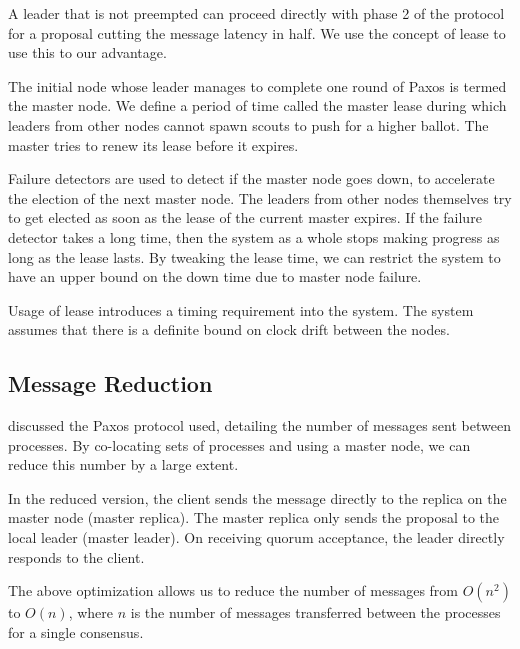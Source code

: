 A leader that is not preempted can proceed directly with phase 2 of the
protocol for a proposal cutting the message latency in half. We use the
concept of lease to use this to our advantage.

The initial node whose leader manages to complete one round of Paxos is
termed the master node. We define a period of time called the master lease
during which leaders from other nodes cannot spawn scouts to push for a
higher ballot. The master tries to renew its lease before it expires.

Failure detectors%
are used to detect if the master node goes down, to accelerate the election
of the next master node. The leaders from other nodes themselves try to
get elected as soon as the lease of the current master expires. If the
failure detector takes a long time, then the system as a whole
stops making progress as long as the lease lasts. By tweaking the lease
time, we can restrict the system to have an upper bound on the down time
due to master node failure.

Usage of lease introduces a timing requirement into the system. The system
assumes that there is a definite bound on clock drift%
between the nodes.

\subsection{Message Reduction}

 discussed the Paxos protocol used, detailing the number
of messages sent between processes. By co-locating sets of processes and
using a master node, we can reduce this number by a large extent.

In the reduced version, the client sends the message directly to the
replica on the master node (master replica). The master replica only
sends the proposal to the local leader (master leader). On receiving quorum
acceptance, the leader directly responds to the client.

The above optimization allows us to reduce the number of messages from
$O(n^2)$ to $O(n)$, where $n$ is the number of messages transferred between
the processes for a single consensus.

